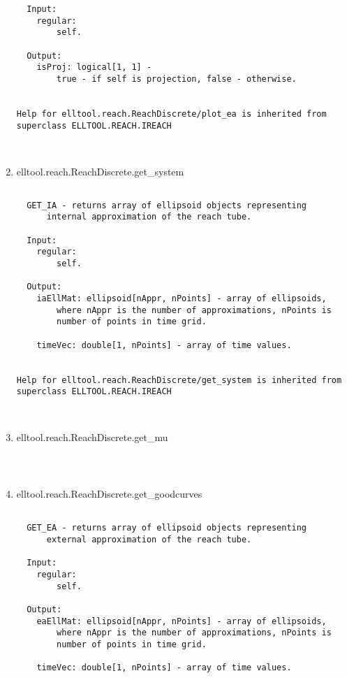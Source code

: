 \begin{enumerate}
\begin{lstlisting}
  Input:
    regular:
        self.

  Output:
    isProj: logical[1, 1] -
        true - if self is projection, false - otherwise.


Help for elltool.reach.ReachDiscrete/plot_ea is inherited from superclass ELLTOOL.REACH.IREACH



\end{lstlisting}
\fontfamily{\familydefault}
\selectfont
\item {elltool.reach.ReachDiscrete.get\_system}
\selectfont
\begin{lstlisting}

  GET_IA - returns array of ellipsoid objects representing
      internal approximation of the reach tube.

  Input:
    regular:
        self.

  Output:
    iaEllMat: ellipsoid[nAppr, nPoints] - array of ellipsoids,
        where nAppr is the number of approximations, nPoints is
        number of points in time grid.

    timeVec: double[1, nPoints] - array of time values.


Help for elltool.reach.ReachDiscrete/get_system is inherited from superclass ELLTOOL.REACH.IREACH



\end{lstlisting}
\fontfamily{\familydefault}
\selectfont
\item {elltool.reach.ReachDiscrete.get\_mu}
\selectfont
\begin{lstlisting}



\end{lstlisting}
\fontfamily{\familydefault}
\selectfont
\item {elltool.reach.ReachDiscrete.get\_goodcurves}
\selectfont
\begin{lstlisting}

  GET_EA - returns array of ellipsoid objects representing
      external approximation of the reach tube.

  Input:
    regular:
        self.

  Output:
    eaEllMat: ellipsoid[nAppr, nPoints] - array of ellipsoids,
        where nAppr is the number of approximations, nPoints is
        number of points in time grid.

    timeVec: double[1, nPoints] - array of time values.



\end{lstlisting}
\end{enumerate}
